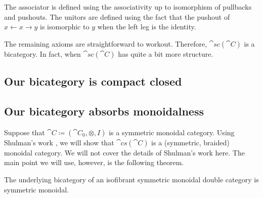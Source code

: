 \documentclass[./Spans_of_cospans_II.tex]{subfiles}
\begin{document}
The associator is defined using the associativity up to isomorphism of pullbacks and pushouts.  The unitors are defined using the fact that the pushout of $x \gets x \to y$ is isomorphic to $y$ when the left leg is the identity.  

The remaining axioms are straightforward to workout. Therefore, $\cat{sc}(\cat{C})$ is a bicategory. In fact, when $\cat{sc}(\cat{C})$ has quite a bit more structure.

\subsection{Our bicategory is compact closed}  


\subsection{Our bicategory absorbs monoidalness}  

Suppose that $\cat{C} \coloneqq (\cat{C}_0, \otimes, I)$ is a symmetric monoidal category.  Using Shulman's work \cite{Shulman}, we will show that $\cat{cs}(\cat{C})$ is a (symmetric, braided) monoidal category. We will not cover the details of Shulman's work here.  The main point we will use, however, is the following theorem.

\begin{thm}
	\label{thm:Shulmans thm}
	The underlying bicategory of an isofibrant symmetric monoidal double category is symmetric monoidal.  
\end{thm}
\end{document}
